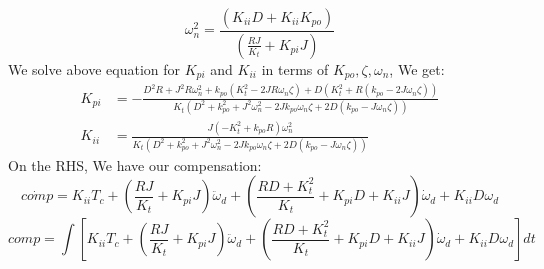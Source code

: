 \documentclass[12pt,a4paper]{article}
\begin{document}
	\[
	\omega_n^2 = \frac{(K_{ii}D+K_{ii}K_{po})}{(\frac{RJ}{K_t} + K_{pi}J )}
	\]
	We solve above equation for $ K_{pi} $ and $ K_{ii} $ in terms of $ K_{po},\zeta,\omega_n $, We get:
	\[
	\begin{split}
		K_{pi} &= -\frac{D^2R+J^2R\omega_n^2+k_{po}(K_t^2-2JR\omega_n\zeta)+D(K_t^2+R(k_{po}-2J\omega_n\zeta))} {K_t(D^2+k_{po}^2+J^2\omega_n^2-2Jk_{po}\omega_n\zeta+2D(k_{po}-J\omega_n\zeta))} \\
		K_{ii} &= \frac{J(-K_t^2+k_{po}R)\omega_n^2} {K_t(D^2+k_{po}^2+J^2\omega_n^2-2Jk_{po}\omega_n\zeta+2D(k_{po}-J\omega_n\zeta))}
	\end{split}
	\]
	On the RHS, We have our compensation:
	\[
	\dot{comp} = K_{ii}T_c +(\frac{RJ}{K_t} + K_{pi}J ) \ddot{\omega}_d + (\frac{RD + K_t^2}{K_t}+ K_{pi}D + K_{ii}J) \dot{\omega}_d+K_{ii}D\omega_d
	\]
	\[
	comp = \int \left[ K_{ii}T_c +(\frac{RJ}{K_t} + K_{pi}J ) \ddot{\omega}_d + (\frac{RD + K_t^2}{K_t}+ K_{pi}D + K_{ii}J) \dot{\omega}_d+K_{ii}D\omega_d\right] dt
	\]
	
\end{document}
